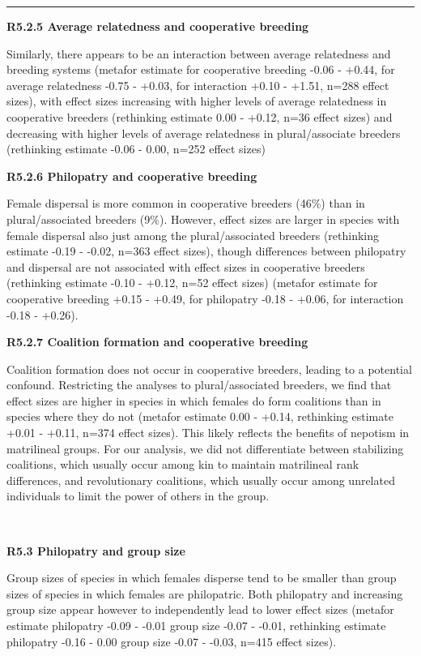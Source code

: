 \documentclass[
]{article}
\begin{document}
\begin{center}\rule{0.5\linewidth}{0.5pt}\end{center}

\textbf{R5.2.5 Average relatedness and cooperative breeding}

Similarly, there appears to be an interaction between average
relatedness and breeding systems (metafor estimate for cooperative
breeding -0.06 - +0.44, for average relatedness -0.75 - +0.03, for
interaction +0.10 - +1.51, n=288 effect sizes), with effect sizes
increasing with higher levels of average relatedness in cooperative
breeders (rethinking estimate 0.00 - +0.12, n=36 effect sizes) and
decreasing with higher levels of average relatedness in plural/associate
breeders (rethinking estimate -0.06 - 0.00, n=252 effect sizes)

\textbf{R5.2.6 Philopatry and cooperative breeding}

Female dispersal is more common in cooperative breeders (46\%) than in
plural/associated breeders (9\%). However, effect sizes are larger in
species with female dispersal also just among the plural/associated
breeders (rethinking estimate -0.19 - -0.02, n=363 effect sizes), though
differences between philopatry and dispersal are not associated with
effect sizes in cooperative breeders (rethinking estimate -0.10 - +0.12,
n=52 effect sizes) (metafor estimate for cooperative breeding +0.15 -
+0.49, for philopatry -0.18 - +0.06, for interaction -0.18 - +0.26).

\textbf{R5.2.7 Coalition formation and cooperative breeding}

Coalition formation does not occur in cooperative breeders, leading to a
potential confound. Restricting the analyses to plural/associated
breeders, we find that effect sizes are higher in species in which
females do form coalitions than in species where they do not (metafor
estimate 0.00 - +0.14, rethinking estimate +0.01 - +0.11, n=374 effect
sizes). This likely reflects the benefits of nepotism in matrilineal
groups. For our analysis, we did not differentiate between stabilizing
coalitions, which usually occur among kin to maintain matrilineal rank
differences, and revolutionary coalitions, which usually occur among
unrelated individuals to limit the power of others in the group.

~

\textbf{R5.3 Philopatry and group size}

Group sizes of species in which females disperse tend to be smaller than
group sizes of species in which females are philopatric. Both philopatry
and increasing group size appear however to independently lead to lower
effect sizes (metafor estimate philopatry -0.09 - -0.01 group size -0.07
- -0.01, rethinking estimate philopatry -0.16 - 0.00 group size -0.07 -
-0.03, n=415 effect sizes).
\end{document}
